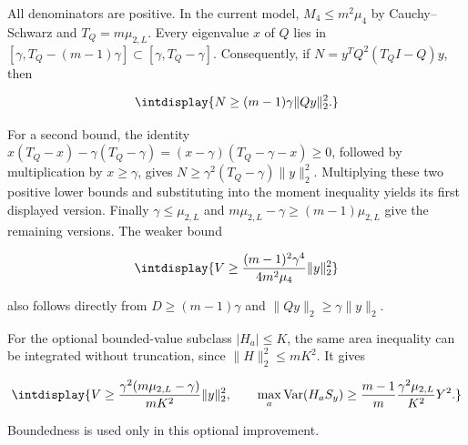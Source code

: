 
All denominators are positive. In the current model, \(M_4\le m^2\mu_4\) by Cauchy--Schwarz and \(T_Q=m\mu_{2,\allowbreak L}\). Every eigenvalue \(x\) of \(Q\) lies in \([\gamma,\allowbreak T_Q-(m-1)\gamma]\subset[\gamma,\allowbreak T_Q-\gamma]\). Consequently, if \(N=y^TQ^2(T_QI-Q)y\), then


\begingroup\renewcommand{\theHequation}{intdisplay.487}
\begin{equation*}
\intdisplay{
N\ge(m-1)\gamma\|Qy\|_2^2.
}
\end{equation*}
\endgroup


For a second bound, the identity \(x(T_Q-x)-\gamma(T_Q-\gamma) =(x-\gamma)(T_Q-\gamma-x)\ge0\), followed by multiplication by \(x\ge\gamma\), gives \(N\ge\gamma^2(T_Q-\gamma)\|y\|_2^2\). Multiplying these two positive lower bounds and substituting into the moment inequality yields its first displayed version. Finally \(\gamma\le\mu_{2,\allowbreak L}\) and \(m\mu_{2,\allowbreak L}-\gamma\ge(m-1)\mu_{2,\allowbreak L}\) give the remaining versions. The weaker bound


\begingroup\renewcommand{\theHequation}{intdisplay.488}
\begin{equation*}
\intdisplay{
V\ge\frac{(m-1)^2\gamma^4}{4m^2\mu_4}\|y\|_2^2
}
\end{equation*}
\endgroup


also follows directly from \(D\ge(m-1)\gamma\) and \(\|Qy\|_2\ge\gamma\|y\|_2\).



For the optional bounded-value subclass \(|H_a|\le K\), the same area inequality can be integrated without truncation, since \(\|H\|_2^2\le mK^2\). It gives


\begingroup\renewcommand{\theHequation}{intdisplay.489}
\begin{equation*}
\intdisplay{
V\ge\frac{\gamma^2(m\mu_{2,L}-\gamma)}{mK^2}\|y\|_2^2,
\qquad
\max_a\operatorname{Var}(H_aS_y)
\ge\frac{m-1}{m}\frac{\gamma^2\mu_{2,L}}{K^2}Y^2.
}
\end{equation*}
\endgroup


Boundedness is used only in this optional improvement.


